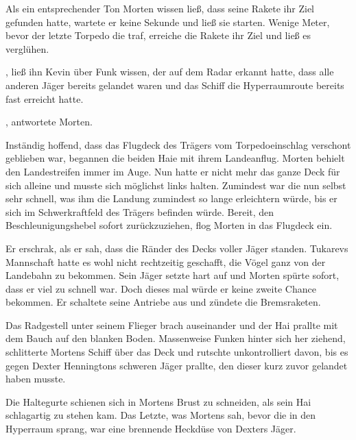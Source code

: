 \par

Als ein entsprechender Ton Morten wissen ließ, dass seine Rakete ihr Ziel gefunden hatte, wartete er keine Sekunde und ließ sie starten. Wenige Meter, bevor der letzte Torpedo die  traf, erreiche die Rakete ihr Ziel und ließ es verglühen.

\par

, ließ ihn Kevin über Funk wissen, der auf dem Radar erkannt hatte, dass alle anderen Jäger bereits gelandet waren und das Schiff die Hyperraumroute bereits fast erreicht hatte.

\par

, antwortete Morten. 

\par

Inständig hoffend, dass das Flugdeck des Trägers vom Torpedoeinschlag verschont geblieben war, begannen die beiden Haie mit ihrem Landeanflug. Morten behielt den Landestreifen immer im Auge. Nun hatte er nicht mehr das ganze Deck für sich alleine und musste sich möglichst links halten. Zumindest war die  nun selbst sehr schnell, was ihm die Landung zumindest so lange erleichtern würde, bis er sich im Schwerkraftfeld des Trägers befinden würde. Bereit, den Beschleunigungshebel sofort zurückzuziehen, flog Morten in das Flugdeck ein.

\par

Er erschrak, als er sah, dass die Ränder des Decks voller Jäger standen. Tukarevs Mannschaft hatte es wohl nicht rechtzeitig geschafft, die Vögel ganz von der Landebahn zu bekommen. Sein Jäger setzte hart auf und Morten spürte sofort, dass er viel zu schnell war. Doch dieses mal würde er keine zweite Chance bekommen. Er schaltete seine Antriebe aus und zündete die Bremsraketen.

\par

Das Radgestell unter seinem Flieger brach auseinander und der Hai prallte mit dem Bauch auf den blanken Boden. Massenweise Funken hinter sich her ziehend, schlitterte Mortens Schiff über das Deck und rutschte unkontrolliert davon, bis es gegen Dexter Henningtons schweren Jäger prallte, den dieser kurz zuvor gelandet haben musste.

\par

Die Haltegurte schienen sich in Mortens Brust zu schneiden, als sein Hai schlagartig zu stehen kam. Das Letzte, was Mortens sah, bevor die  in den Hyperraum sprang, war eine brennende Heckdüse von Dexters Jäger.
